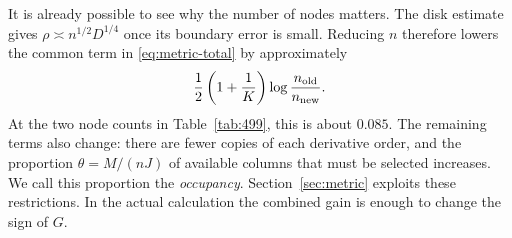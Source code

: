 It is already possible to see why the number of nodes matters. The disk estimate gives $\rho\asymp n^{1/2}D^{1/4}$ once its boundary error is small. Reducing $n$ therefore lowers the common term in \eqref{eq:metric-total} by approximately
\[
 \frac12\left(1+\frac1K\right)\log\frac{n_{\rm old}}{n_{\rm new}}.
\]
At the two node counts in Table~\ref{tab:499}, this is about $0.085$. The remaining terms also change: there are fewer copies of each derivative order, and the proportion $\theta=M/(nJ)$ of available columns that must be selected increases. We call this proportion the \emph{occupancy}. Section~\ref{sec:metric} exploits these restrictions. In the actual calculation the combined gain is enough to change the sign of $G$.
